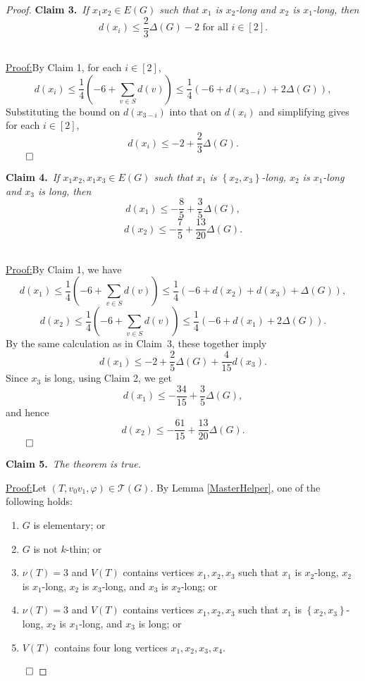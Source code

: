 \documentclass[12pt]{article}
\theoremstyle{plain}
\theoremstyle{definition}
\theoremstyle{remark}
\newcommand{\fancy}[1]{\mathcal{#1}}
\newcommand{\T}{\fancy{T}}
\newcommand{\set}[1]{\left\{ #1 \right\}}
\newcommand{\irange}[1]{\left[#1\right]}
\newcommand{\parens}[1]{\left( #1 \right)}
\newcommand{\vph}{\varphi}
\newcommand{\claim}[2]{{\noindent\bf Claim #1.}~{\it #2}~~}
\newenvironment{claimproof}[1]{\par\noindent\underline{Proof:}\space#1}{\leavevmode\unskip\penalty9999
\hbox{}\nobreak\hfill\quad\hbox{$\qed$}}
\begin{document}
\begin{proof}
\claim{3}{If $x_1x_2 \in E(G)$ such that $x_1$ is $x_2$-long and $x_2$ is
$x_1$-long, %
then
\[d(x_i) \le \frac23\Delta(G) -2 \text{ for all $i \in \irange{2}$.}\]}

\begin{claimproof}
By Claim 1, for each $i \in \irange{2}$,
\[d(x_i) \le \frac14\parens{-6 + \sum_{v \in S} d(v)} \le \frac14\parens{-6 + d(x_{3-i}) + 2\Delta(G)},\]
Substituting the bound on $d(x_{3-i})$ into that on $d(x_i)$ and simplifying
gives for each $i \in \irange{2}$,
\[d(x_i) \le -2 + \frac23\Delta(G).\]
\end{claimproof}

\bigskip

\claim{4}{If $x_1x_2, x_1x_3 \in E(G)$ such that $x_1$ is $\set{x_2,x_3}$-long, $x_2$ is $x_1$-long and $x_3$ is long, then 
\[d(x_1) \le -\frac85 + \frac35\Delta(G),\]
\[d(x_2) \le -\frac75 + \frac{13}{20}\Delta(G).\]}

\begin{claimproof}
By Claim 1, we have
\[d(x_1) \le \frac14\parens{-6 + \sum_{v \in S} d(v)} \le \frac14\parens{-6 + d(x_2) + d(x_3) + \Delta(G)},\]
\[d(x_2) \le \frac14\parens{-6 + \sum_{v \in S} d(v)} \le \frac14\parens{-6 + d(x_1) + 2\Delta(G)}.\]
By the same calculation as in Claim~3, these together imply
\[d(x_1) \le -2 + \frac25\Delta(G) + \frac{4}{15}d(x_3).\]
Since $x_3$ is long, using Claim 2, we get
\[d(x_1) \le -\frac{34}{15} + \frac35\Delta(G),\]
and hence
\[d(x_2) \le -\frac{61}{15} + \frac{13}{20}\Delta(G).\]
\end{claimproof}
\bigskip

\claim{5}{The theorem is true.}

\begin{claimproof}
Let $(T, v_0v_1, \vph) \in \T(G)$. By Lemma \ref{MasterHelper}, one of the following holds:
\begin{enumerate}
\item $G$ is elementary; or
\item $G$ is not $k$-thin; or
\item $\nu(T) = 3$ and $V(T)$ contains vertices $x_1,x_2,x_3$ such that $x_1$
is $x_2$-long, $x_2$ is $x_1$-long, $x_2$ is $x_3$-long, and $x_3$ is $x_2$-long; or
\item $\nu(T) = 3$ and $V(T)$ contains vertices $x_1,x_2,x_3$ such that $x_1$ is
$\set{x_2,x_3}$-long, $x_2$ is $x_1$-long, and $x_3$ is long; or
\item $V(T)$ contains four long vertices $x_1, x_2, x_3, x_4$.
\end{enumerate}


\end{claimproof}
\end{proof}
\end{document}

